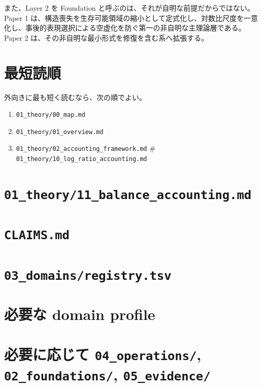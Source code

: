 \documentclass[12pt,a4paper]{article}
\begin{document}
また、Layer 2 を Foundation と呼ぶのは、それが自明な前提だからではない。Paper 1 は、構造喪失を生存可能領域の縮小として定式化し、対数比尺度を一意化し、事後的表現選択による空虚化を防ぐ第一の非自明な主理論層である。Paper 2 は、その非自明な最小形式を修復を含む系へ拡張する。

\section{最短読順}\label{ux6700ux77edux8aadux9806}

外向きに最も短く読むなら、次の順でよい。

\begin{enumerate}
\def\labelenumi{\arabic{enumi}.}
\tightlist
\item
  \texttt{01\_theory/00\_map.md}
\item
  \texttt{01\_theory/01\_overview.md}
\item
  \texttt{01\_theory/02\_accounting\_framework.md} \# \texttt{01\_theory/10\_log\_ratio\_accounting.md}
\end{enumerate}

\section{\texorpdfstring{\texttt{01\_theory/11\_balance\_accounting.md}}{01\_theory/11\_balance\_accounting.md}}\label{theory11_balance_accounting.md}

\section{\texorpdfstring{\texttt{CLAIMS.md}}{CLAIMS.md}}\label{claims.md}

\section{\texorpdfstring{\texttt{03\_domains/registry.tsv}}{03\_domains/registry.tsv}}\label{domainsregistry.tsv}

\section{必要な domain profile}\label{ux5fc5ux8981ux306a-domain-profile}

\section{\texorpdfstring{必要に応じて \texttt{04\_operations/}, \texttt{02\_foundations/}, \texttt{05\_evidence/}}{必要に応じて 04\_operations/, 02\_foundations/, 05\_evidence/}}\label{ux5fc5ux8981ux306bux5fdcux3058ux3066-04_operations-02_foundations-05_evidence}
\end{document}
